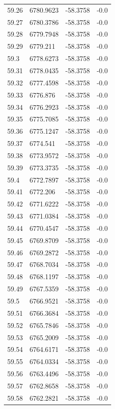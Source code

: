 \begin{table}[H]
\begin{tabular}{llll}
59.26 & 6780.9623 & -58.3758 & -0.0 \\
59.27 & 6780.3786 & -58.3758 & -0.0 \\
59.28 & 6779.7948 & -58.3758 & -0.0 \\
59.29 & 6779.211 & -58.3758 & -0.0 \\
59.3 & 6778.6273 & -58.3758 & -0.0 \\
59.31 & 6778.0435 & -58.3758 & -0.0 \\
59.32 & 6777.4598 & -58.3758 & -0.0 \\
59.33 & 6776.876 & -58.3758 & -0.0 \\
59.34 & 6776.2923 & -58.3758 & -0.0 \\
59.35 & 6775.7085 & -58.3758 & -0.0 \\
59.36 & 6775.1247 & -58.3758 & -0.0 \\
59.37 & 6774.541 & -58.3758 & -0.0 \\
59.38 & 6773.9572 & -58.3758 & -0.0 \\
59.39 & 6773.3735 & -58.3758 & -0.0 \\
59.4 & 6772.7897 & -58.3758 & -0.0 \\
59.41 & 6772.206 & -58.3758 & -0.0 \\
59.42 & 6771.6222 & -58.3758 & -0.0 \\
59.43 & 6771.0384 & -58.3758 & -0.0 \\
59.44 & 6770.4547 & -58.3758 & -0.0 \\
59.45 & 6769.8709 & -58.3758 & -0.0 \\
59.46 & 6769.2872 & -58.3758 & -0.0 \\
59.47 & 6768.7034 & -58.3758 & -0.0 \\
59.48 & 6768.1197 & -58.3758 & -0.0 \\
59.49 & 6767.5359 & -58.3758 & -0.0 \\
59.5 & 6766.9521 & -58.3758 & -0.0 \\
59.51 & 6766.3684 & -58.3758 & -0.0 \\
59.52 & 6765.7846 & -58.3758 & -0.0 \\
59.53 & 6765.2009 & -58.3758 & -0.0 \\
59.54 & 6764.6171 & -58.3758 & -0.0 \\
59.55 & 6764.0334 & -58.3758 & -0.0 \\
59.56 & 6763.4496 & -58.3758 & -0.0 \\
59.57 & 6762.8658 & -58.3758 & -0.0 \\
59.58 & 6762.2821 & -58.3758 & -0.0 \\

\end{tabular}
\end{table}
